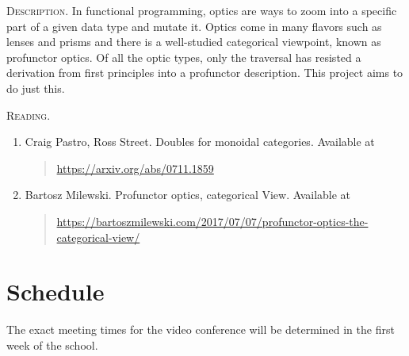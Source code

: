 \documentclass[11pt, oneside]{article}
\begin{document}
\textsc{Description.}
In functional programming, optics are ways to zoom into a
specific part of a given data type and mutate it. Optics
come in many flavors such as lenses and prisms and there is
a well-studied categorical viewpoint, known as profunctor
optics. Of all the optic types, only the traversal has
resisted a derivation from first principles into a
profunctor description. This project aims to do just this.

\textsc{Reading.}
\begin{enumerate}
\item \label{bm1}
  Craig Pastro, Ross Street. Doubles for monoidal
  categories. Available at
  \begin{quote}
    \href{https://arxiv.org/abs/0711.1859}{https://arxiv.org/abs/0711.1859}
  \end{quote}
\item \label{bm2}
  Bartosz Milewski. Profunctor optics, categorical
  View. Available at
  \begin{quote} \href{https://bartoszmilewski.com/2017/07/07/profunctor-optics-the-categorical-view/}{https://bartoszmilewski.com/2017/07/07/profunctor-optics-the-categorical-view/}
  \end{quote}
\end{enumerate}

\pagebreak

\section{Schedule}
\label{sec:schedule}

The exact meeting times for the video conference will be
determined in the first week of the school. 
\end{document}
